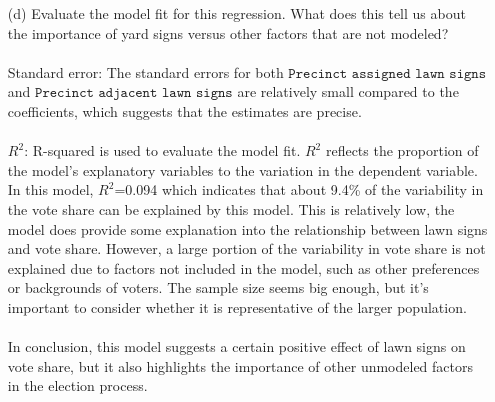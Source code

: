 \documentclass[12pt,letterpaper]{article}
\begin{document}
\begin{enumerate}
	\item [(d)] Evaluate the model fit for this regression.  What does this	tell us about the importance of yard signs versus other factors that are not modeled?\\\\
	\noindent  Standard error: The standard errors for both \(\texttt{Precinct assigned lawn signs} \) and \(\texttt{Precinct adjacent lawn signs} \) are relatively small compared to the coefficients, which suggests that the estimates are precise.\\\\
	\noindent $R^2$: R-squared is used to evaluate the model fit. $R^2$ reflects the proportion of the model’s explanatory variables to the variation in the dependent variable. In this model, $R^2$=0.094 which indicates that about 9.4\% of the variability in the vote share can be explained by this model. This is relatively low, the model does provide some explanation into the relationship between lawn signs and vote share. However, a large portion of the variability in vote share is not explained due to factors not included in the model, such as other preferences or backgrounds of voters.
	\noindent  The sample size seems big enough, but it's important to consider whether it is representative of the larger population.\\\\
	\noindent In conclusion, this model suggests a certain positive effect of lawn signs on vote share, but it also highlights the importance of other unmodeled factors in the election process.
\end{enumerate}  
\end{document}

